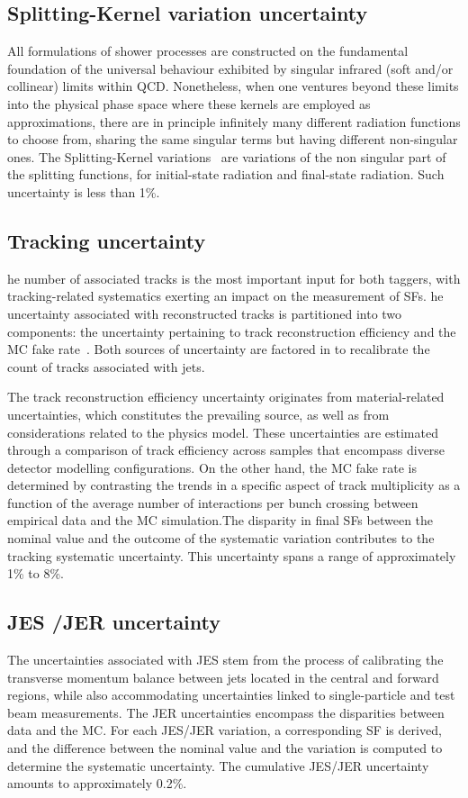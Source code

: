 \subsection{Splitting-Kernel variation uncertainty}
All formulations of shower processes are constructed on the fundamental foundation of the universal behaviour exhibited by singular infrared (soft and/or collinear) limits within QCD. Nonetheless, when one ventures beyond these limits into the physical phase space where these kernels are employed as approximations, there are in principle infinitely many different radiation functions to choose from, sharing the same singular terms but having different non-singular ones.  The Splitting-Kernel variations~\cite{Mrenna:2016sih} are variations of the non singular part of the splitting functions, for initial-state radiation and final-state radiation. Such uncertainty is less than 1\%.
  
    \subsection{Tracking uncertainty}

he number of associated tracks is the most important input for both taggers, with tracking-related systematics exerting an impact on the measurement of SFs. he uncertainty associated with reconstructed tracks is partitioned into two components: the uncertainty pertaining to track reconstruction efficiency and the MC fake rate~\cite{ATLAS:2017kyn}. Both sources of uncertainty are factored in to recalibrate the count of tracks associated with jets.

 The track reconstruction efficiency uncertainty originates from material-related uncertainties, which constitutes the prevailing source, as well as from considerations related to the physics model. These uncertainties are estimated through a comparison of track efficiency across samples that encompass diverse detector modelling configurations. On the other hand, the MC fake rate is determined by contrasting the trends in a specific aspect of track multiplicity as a function of the average number of interactions per bunch crossing between empirical data and the MC simulation.The disparity in final SFs between the nominal value and the outcome of the systematic variation contributes to the tracking systematic uncertainty. This uncertainty spans a range of approximately 1\% to 8\%.

  \subsection{JES /JER uncertainty }
The uncertainties associated with JES stem from the process of calibrating the transverse momentum balance between jets located in the central and forward regions, while also accommodating uncertainties linked to single-particle and test beam measurements. The JER uncertainties encompass the disparities between data and the MC. For each JES/JER variation, a corresponding SF is derived, and the difference between the nominal value and the variation is computed to determine the systematic uncertainty. The cumulative JES/JER uncertainty amounts to approximately 0.2\%.
  
